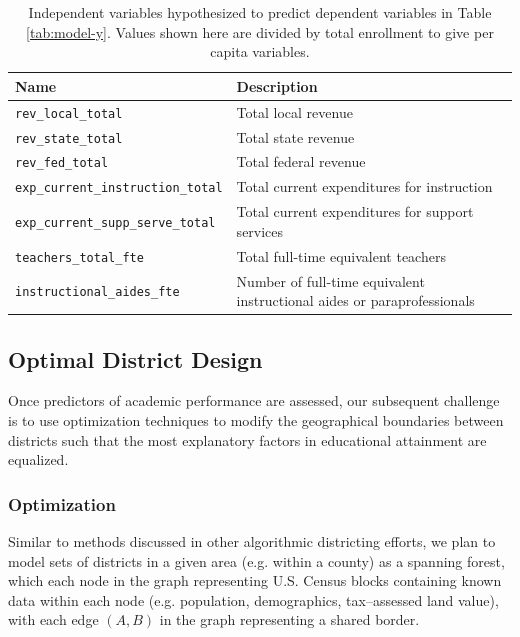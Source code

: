 \documentclass{article}
\begin{document}
\begin{table}[h]
    \centering
    \begin{tabular}{lp{8cm}}
         \textbf{Name} & \textbf{Description} \\ \hline
         \texttt{rev\_local\_total} & Total local revenue \\ \hline
         \texttt{rev\_state\_total} & Total state revenue \\ \hline
         \texttt{rev\_fed\_total} & Total federal revenue \\ \hline
         \texttt{exp\_current\_instruction\_total} & Total current expenditures for instruction \\ \hline
         \texttt{exp\_current\_supp\_serve\_total} & Total current expenditures for support services \\ \hline
         \texttt{teachers\_total\_fte} &  Total full-time equivalent teachers \\ \hline
         \texttt{instructional\_aides\_fte} & Number of full-time equivalent instructional aides or paraprofessionals
    \end{tabular}
    \caption{Independent variables hypothesized to predict dependent variables in Table \ref{tab:model-y}. Values shown here are divided by total enrollment to give per capita variables.}
    \label{tab:model-x}
\end{table}

\subsection{Optimal District Design}
Once predictors of academic performance are assessed, our subsequent challenge is to use optimization techniques to modify the geographical boundaries between districts such that the most explanatory factors in educational attainment are equalized. 

\subsubsection{Optimization}
Similar to methods discussed in other algorithmic districting efforts\autocite{King2018}, we plan to model sets of districts in a given area (e.g. within a county) as a spanning forest, which each node in the graph representing U.S. Census blocks\autocite{censusblocks} containing known data within each node (e.g. population, demographics\autocite{censusblockdata}, tax--assessed land value\autocite{landvalue}), with each edge \((A,B)\) in the graph representing a shared border. 
\end{document}
